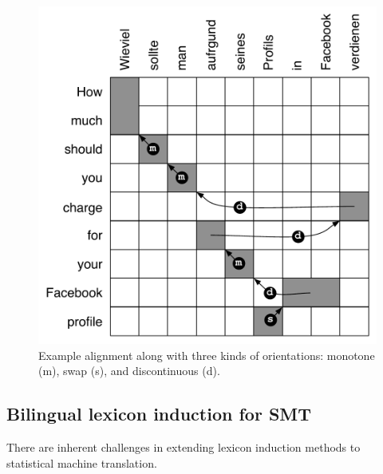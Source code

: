 \documentclass[11pt]{article}
\begin{document}
\begin{figure}[t]
\vskip 0.1in
\begin{center}
\includegraphics[width=0.82 \linewidth]{../figures/reorderfeats/reorderfeats.pdf}
\caption{Example alignment along with three kinds of orientations: monotone (m), swap (s), and discontinuous (d). }
\label{fig:reorderfeats} 
\end{center}
\end{figure}


 \subsection{Bilingual lexicon induction for SMT} \label{sect:bckg:lexind}
 
There are inherent challenges in extending lexicon induction methods to statistical machine translation.  
\end{document}
